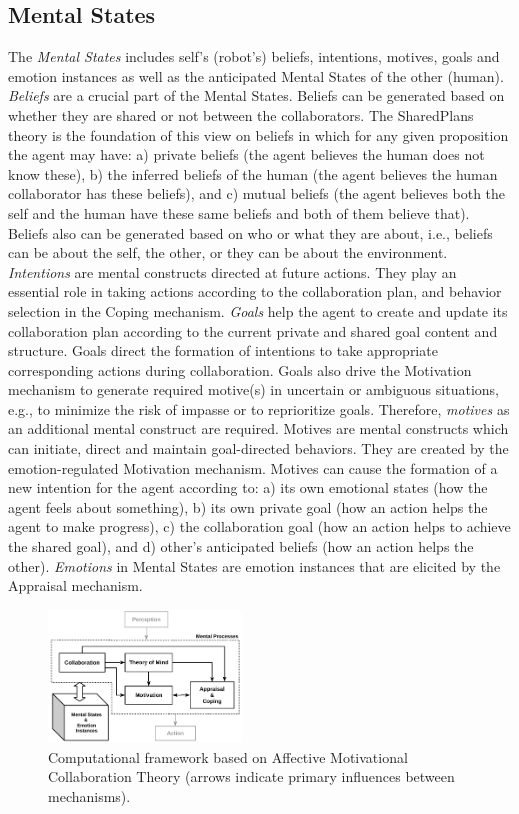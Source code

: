\documentclass[letterpaper]{article}
\begin{document}
\subsection{Mental States}

The \textit{Mental States} includes
self's (robot's) beliefs, intentions, motives, goals and emotion instances as
well as the anticipated Mental States of the other (human). \textit{Beliefs} are
a crucial part of the Mental States. Beliefs can be generated based on whether
they are shared or not between the collaborators. The SharedPlans
\cite{grosz:shared-plans} theory is the foundation of this view on beliefs in
which for any given proposition the agent may have: a) private beliefs (the
agent believes the human does not know these), b) the inferred beliefs of the
human (the agent believes the human collaborator has these beliefs), and c)
mutual beliefs (the agent believes both the self and the human have these same
beliefs and both of them believe that). Beliefs also can be generated based on
who or what they are about, i.e., beliefs can be about the self, the other, or
they can be about the environment. \textit{Intentions} are mental constructs
directed at future actions. They play an essential role in taking actions
according to the collaboration plan, and behavior selection in the Coping
mechanism. \textit{Goals} help the agent to create and update its collaboration
plan according to the current private and shared goal content and structure.
Goals direct the formation of intentions to take appropriate corresponding
actions during collaboration. Goals also drive the Motivation mechanism to
generate required motive(s) in uncertain or ambiguous situations, e.g., to
minimize the risk of impasse or to reprioritize goals. Therefore,
\textit{motives} as an additional mental construct are required. Motives are
mental constructs which can initiate, direct and maintain goal-directed
behaviors. They are created by the emotion-regulated Motivation mechanism.
Motives can cause the formation of a new intention for the agent according to:
a) its own emotional states (how the agent feels about something), b) its own
private goal (how an action helps the agent to make progress), c) the
collaboration goal (how an action helps to achieve the shared goal), and d)
other's anticipated beliefs (how an action helps the other). \textit{Emotions}
in Mental States are emotion instances that are elicited by the Appraisal
mechanism.

\begin{figure}[tbh]
  \centering
  \includegraphics[width=0.46\textwidth]{figure/theory-general-croped.pdf}
  \caption{Computational framework based on Affective Motivational Collaboration
  Theory (arrows indicate primary influences between mechanisms).}
  \label{fig:cpm}
\end{figure}
\end{document}
